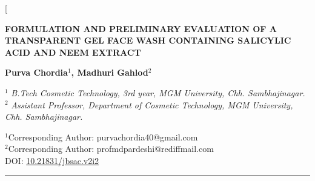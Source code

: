 \documentclass[10pt,a4paper,twocolumn]{article}
\begin{document}
\twocolumn[{%
  \singlespacing
  \begin{center}
    {\Large\bfseries FORMULATION AND PRELIMINARY EVALUATION OF A TRANSPARENT GEL FACE WASH CONTAINING SALICYLIC ACID AND NEEM EXTRACT\par}
    \vspace{0.5cm}
    {\large\bfseries Purva Chordia$^{1}$, Madhuri Gahlod$^{2}$\par}
    \vspace{0.3cm}
    {\normalsize $^1$ \textit{B.Tech Cosmetic Technology, 3rd year, MGM University, Chh. Sambhajinagar.}\\
    $^2$ \textit{Assistant Professor, Department of Cosmetic Technology, MGM University, Chh. Sambhajinagar.}\par}
    \vspace{0.2cm}
    {\normalsize $^1$Corresponding Author: purvachordia40@gmail.com\\\normalsize $^2$Corresponding Author: profmdpardeshi@rediffmail.com\\ DOI: \href{https://doi.org/10.21831/jbsac.v2i2}{10.21831/jbsac.v2i2}\par}
    \vspace{0.3cm}
    \rule{\textwidth}{0.8pt}
    \vspace{0.3cm}
  \end{center}
  
}
\end{document}
